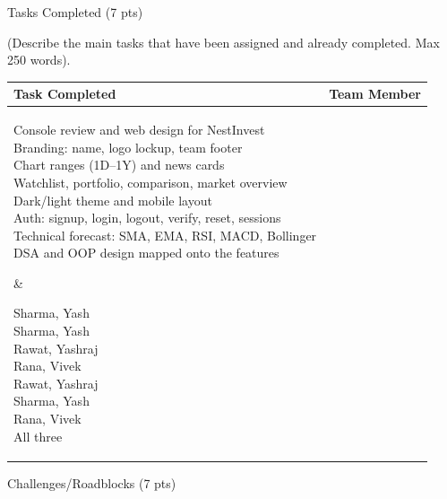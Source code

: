 \documentclass[12pt,a4paper]{article}
\newcommand{\sectiontitle}[1]{%
    {\color{GEUBlue}
    \fontsize{18}{22}\selectfont #1}
}
\newcommand{\instruction}[1]{%
    {\color{InstructionGrey}
    \fontsize{10.5}{13}\selectfont #1}
}
\begin{document}
\newpage


\vspace*{0.20cm}

\sectiontitle{Tasks Completed (7 pts)}

\vspace{0.05cm}

\instruction{
(Describe the main tasks that have been assigned and already completed.
Max 250 words).
}

\vspace{0.20cm}

\begin{tabularx}{\textwidth}{
|>{\raggedright\arraybackslash}X
|>{\raggedright\arraybackslash}X|
}
\hline
\textbf{Task Completed} &
\textbf{Team Member}\\
\hline

\parbox[t][3.25cm][t]{\linewidth}{\vspace{2pt}\fontsize{8.5}{10}\selectfont
Console review and web design for NestInvest\\
Branding: name, logo lockup, team footer\\
Chart ranges (1D--1Y) and news cards\\
Watchlist, portfolio, comparison, market overview\\
Dark/light theme and mobile layout\\
Auth: signup, login, logout, verify, reset, sessions\\
Technical forecast: SMA, EMA, RSI, MACD, Bollinger\\
DSA and OOP design mapped onto the features}
&
\parbox[t][3.25cm][t]{\linewidth}{\vspace{2pt}\fontsize{8.5}{10}\selectfont
Sharma, Yash\\
Sharma, Yash\\
Rawat, Yashraj\\
Rana, Vivek\\
Rawat, Yashraj\\
Sharma, Yash\\
Rana, Vivek\\
All three}
\\
\hline
\end{tabularx}

\vspace{0.65cm}

\sectiontitle{Challenges/Roadblocks (7 pts)}
\end{document}
